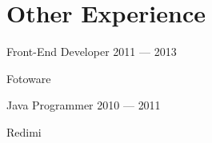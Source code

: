 \section{Other Experience}
\newcommand{\pos}[4]{%
	\parbox[t][][t]{\linewidth}{%
		\parbox{\linewidth}{{#1} \hfill {{#3} --- {#4}}}
		\parbox{\linewidth}{{#2}}
	}
\bigbreak
\smallskip
}


\pos{Front-End Developer}{Fotoware}{2011}{2013}
\pos{Java Programmer}{Redimi}{2010}{2011}


%
%
%


